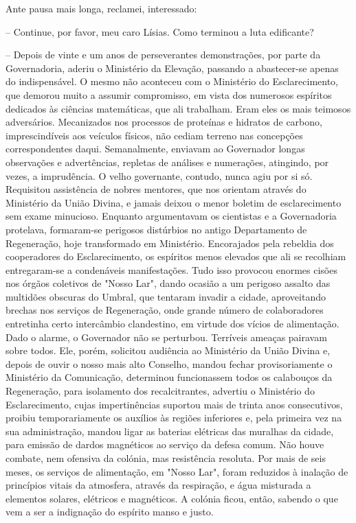 \documentclass[portuguese,12pt,a4paper]{scrbook}
\begin{document}
	Ante pausa mais longa, reclamei, interessado:
	
	– Continue, por favor, meu caro Lísias. Como terminou a luta edificante?
	
	– Depois de vinte e um anos de perseverantes demonstrações, por parte da Governadoria, aderiu o Ministério da Elevação, passando a abastecer-se apenas do indispensável. O mesmo não aconteceu com o Ministério do Esclarecimento, que demorou muito a assumir compromisso, em vista dos numerosos espíritos dedicados às ciências matemáticas, que ali trabalham. Eram eles os mais teimosos adversários. Mecanizados nos processos de proteínas e hidratos de carbono, imprescindíveis aos veículos físicos, não cediam terreno nas concepções correspondentes daqui. Semanalmente, enviavam ao Governador longas observações e advertências, repletas de análises e numerações, atingindo, por vezes, a imprudência. O velho governante, contudo, nunca agiu por si só. Requisitou assistência de nobres mentores, que nos orientam através do Ministério da União Divina, e jamais deixou o menor boletim de esclarecimento sem exame minucioso. Enquanto argumentavam os cientistas e a Governadoria protelava, formaram-se perigosos distúrbios no antigo Departamento de Regeneração, hoje transformado em Ministério. Encorajados pela rebeldia dos cooperadores do Esclarecimento, os espíritos menos elevados que ali se recolhiam entregaram-se a condenáveis manifestações. Tudo isso provocou enormes cisões nos órgãos coletivos de "Nosso Lar", dando ocasião a um perigoso assalto das multidões obscuras do Umbral, que tentaram invadir a cidade, aproveitando brechas nos serviços de Regeneração, onde grande número de colaboradores entretinha certo intercâmbio clandestino, em virtude dos vícios de alimentação. Dado o alarme, o Governador não se perturbou. Terríveis ameaças pairavam sobre todos. Ele, porém, solicitou audiência ao Ministério da União Divina e, depois de ouvir o nosso mais alto Conselho, mandou fechar provisoriamente o Ministério da Comunicação, determinou funcionassem todos os calabouços da Regeneração, para isolamento dos recalcitrantes, advertiu o Ministério do Esclarecimento, cujas impertinências suportou mais de trinta anos consecutivos, proibiu temporariamente os auxílios às regiões inferiores e, pela primeira vez na sua administração, mandou ligar as baterias elétricas das muralhas da cidade, para emissão de dardos magnéticos ao serviço da defesa comum. Não houve combate, nem ofensiva da colónia, mas resistência resoluta. Por mais de seis meses, os serviços de alimentação, em "Nosso Lar", foram reduzidos à inalação de princípios vitais da atmosfera, através da respiração, e água misturada a elementos solares, elétricos e magnéticos. A colónia ficou, então, sabendo o que vem a ser a indignação do espírito manso e justo.
	
\end{document}
